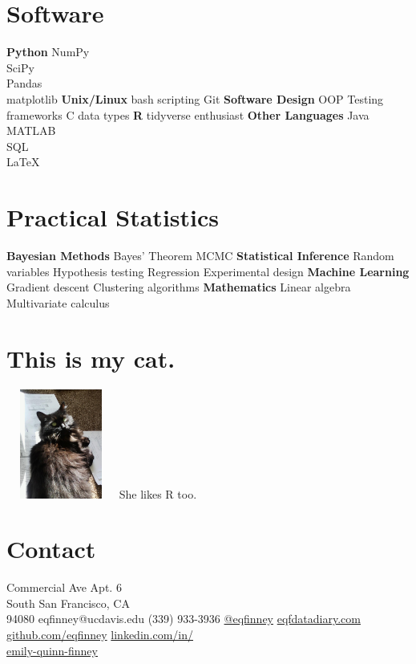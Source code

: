 \documentclass[]{cv-style}          %
\begin{document}
\begin{aside}
%
\section{Software}
\textbf{Python}
NumPy\\ SciPy\\ Pandas\\ matplotlib
\textbf{Unix/Linux}
bash scripting
Git
\textbf{Software Design}
OOP
Testing frameworks
C data types
\textbf{R}
tidyverse enthusiast
\textbf{Other Languages}
Java\\ MATLAB\\ SQL\\ \LaTeX
%
\section{Practical Statistics}
\textbf{Bayesian Methods}
Bayes' Theorem
MCMC
\textbf{Statistical Inference}
Random variables
Hypothesis testing
Regression
Experimental design
\textbf{Machine Learning}
Gradient descent
Clustering algorithms
\textbf{Mathematics}
Linear algebra
Multivariate calculus
%
\section{This is my cat.}
\includegraphics[width=3.6cm,height=3.6cm]{athena.jpg}
She likes R too.
%
\section{Contact}
\fontsize{8}{10} Commercial Ave Apt. 6\\ South San Francisco, CA \\\hspace{0.5cm}94080
%
eqfinney@ucdavis.edu
%
(339) 933-3936
%
\href{https://twitter.com/eqfinney}{@eqfinney}
%
\href{https://eqfdatadiary.com/}{eqfdatadiary.com}
%
\href{https://github.com/eqfinney}{github.com/eqfinney}
%
\href{linkedin.com/in/emily-quinn-finney}{linkedin.com/in/\\\hspace{0.5cm}emily-quinn-finney}
%
\end{aside}
\end{document}
